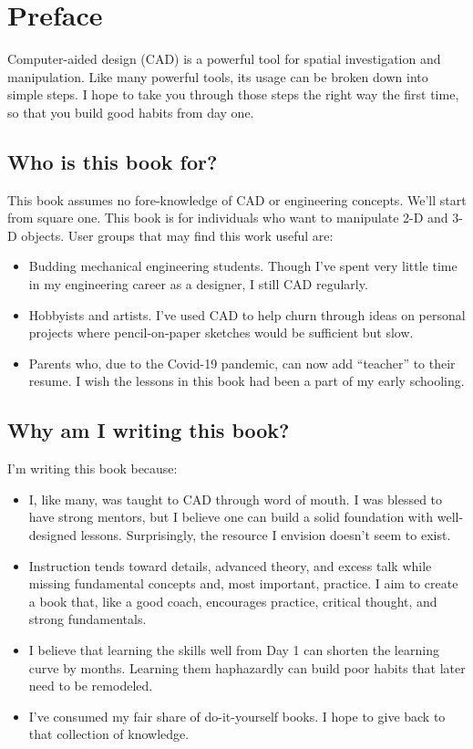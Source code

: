 \chapter{Preface}
Computer-aided design (CAD) is a powerful tool for
spatial investigation and manipulation. Like many 
powerful tools, its usage can be broken down into
simple steps. I hope to take you through those steps
the right way the first time, so that you build good
habits from day one.

\section{Who is this book for?}
This book assumes no fore-knowledge of CAD or engineering
concepts. We'll start from square one. This book is for
individuals who want to manipulate 2-D and 3-D objects. 
User groups that may find this work useful are:

\begin{itemize}
\item Budding mechanical engineering students. Though I've spent
very little time in my engineering career as a designer,
I still CAD regularly.

\item Hobbyists and artists. I've used CAD to help churn through ideas on personal projects where pencil-on-paper
sketches would be sufficient but slow.

\item Parents who, due to the Covid-19 pandemic, can now
add ``teacher'' to their resume. I wish the lessons in
this book had been a part of my early schooling.
\end{itemize}

\section{Why am I writing this book?}

I'm writing this book because:
\begin{itemize}
\item I, like many, was taught to CAD through word of
mouth. I was blessed to have strong mentors, but I 
believe one can build a solid foundation with 
well-designed lessons. Surprisingly, the resource I
envision doesn't seem to exist.

\item Instruction tends toward details, advanced theory,
and excess talk while missing fundamental concepts and,
most important, practice. I aim to create a book that,
like a good coach,
encourages practice, critical thought, and strong
fundamentals.

\item I believe that learning the skills well from 
Day 1 can shorten the learning curve by months. Learning
them haphazardly can build poor habits that later need to
be remodeled.

\item I've consumed my fair share of do-it-yourself
books. I hope to give back to that collection of knowledge.
\end{itemize}

